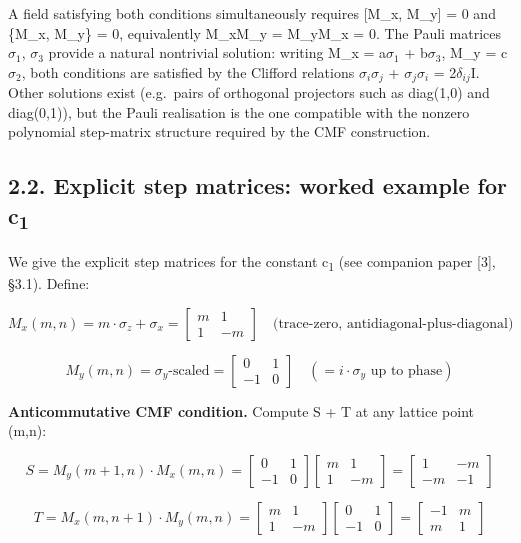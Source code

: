 \documentclass[11pt]{article}
\begin{document}
A field satisfying both conditions simultaneously requires {[}M\_x,
M\_y{]} = 0 and \{M\_x, M\_y\} = 0, equivalently M\_xM\_y = M\_yM\_x =
0. The Pauli matrices \(\sigma_{1}\), \(\sigma_{3}\) provide a natural
nontrivial solution: writing M\_x = a\(\sigma_{1}\) + b\(\sigma_{3}\),
M\_y = c\(\sigma_{2}\), both conditions are satisfied by the Clifford
relations \(\sigma _{i}\sigma _{j}\) + \(\sigma _{j}\sigma _{i}\) =
2\(\delta _{ij}\)I. Other solutions exist (e.g.~pairs of orthogonal
projectors such as diag(1,0) and diag(0,1)), but the Pauli realisation
is the one compatible with the nonzero polynomial step-matrix structure
required by the CMF construction.

\hypertarget{explicit-step-matrices-worked-example-for-c}{%
\subsection{\texorpdfstring{2.2. Explicit step matrices: worked example
for
c\textsubscript{1}}{2.2. Explicit step matrices: worked example for c}}\label{explicit-step-matrices-worked-example-for-c}}

We give the explicit step matrices for the constant c\textsubscript{1}
(see companion paper {[}3{]}, §3.1). Define:

\[M_x(m,n) = m\cdot\sigma_z + \sigma_x = \begin{bmatrix} m & 1 \\ 1 & -m \end{bmatrix} \quad \text{(trace-zero, antidiagonal-plus-diagonal)}\]

\[M_y(m,n) = \sigma_y\text{-scaled} = \begin{bmatrix} 0 & 1 \\ -1 & 0 \end{bmatrix} \quad (= i\cdot\sigma_y \text{ up to phase})\]

\textbf{Anticommutative CMF condition.} Compute S + T at any lattice
point (m,n):

\[S = M_y(m+1,n)\cdot M_x(m,n) = \begin{bmatrix}0&1\\-1&0\end{bmatrix}\begin{bmatrix}m&1\\1&-m\end{bmatrix} = \begin{bmatrix}1&-m\\-m&-1\end{bmatrix}\]

\[T = M_x(m,n+1)\cdot M_y(m,n) = \begin{bmatrix}m&1\\1&-m\end{bmatrix}\begin{bmatrix}0&1\\-1&0\end{bmatrix} = \begin{bmatrix}-1&m\\m&1\end{bmatrix}\]
\end{document}
